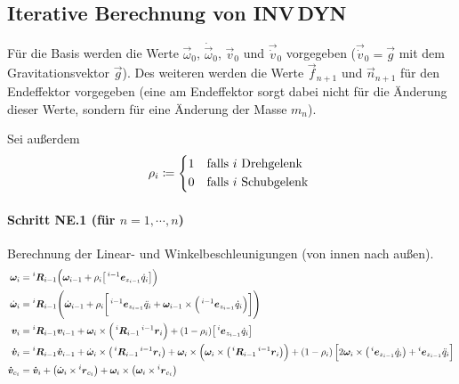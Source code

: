 		\subsection{Iterative Berechnung von INV\,DYN}
			Für die Basis werden die Werte \( \vec{\omega}_0 \), \( \dot{\vec{\omega}}_0 \), \( \vec{v}_0 \) und \( \vec{\dot{v}}_0 \) vorgegeben (\zB \( \vec{\dot{v}}_0 = \vec{g} \) mit dem Gravitationsvektor \(\vec{g}\)). Des weiteren werden die Werte \( \vec{f}_{n + 1} \) und \( \vec{n}_{n + 1} \) für den Endeffektor vorgegeben (eine am Endeffektor sorgt dabei nicht für die Änderung dieser Werte, sondern für eine Änderung der Masse \(m_n\)).

			Sei außerdem
			\begin{equation*}
				\rho_i \coloneqq
					\begin{cases*}
						1 & falls \(i\) Drehgelenk \\
						0 & falls \(i\) Schubgelenk
					\end{cases*}
			\end{equation*}

			\paragraph{Schritt NE.1 (für \( n = 1, \cdots, n \))}
				Berechnung der Linear- und Winkelbeschleunigungen (von innen nach außen).
				\begin{align*}
					\bm{\omega}_i &= \prescript{i}{}{\bm{R}}_{i - 1} \Big( \bm{\omega}_{i - 1} + \rho_i \big[ \prescript{i - 1}{}{\bm{e}}_{z_{i - 1}} \dot{q}_i \big] \Big) \\
					\dot{\bm{\omega}}_i &= \prescript{i}{}{\bm{R}}_{i - 1} \Bigg( \dot{\bm{\omega}}_{i - 1} + \rho_i \bigg[ \prescript{i - 1}{}{\bm{e}}_{z_{i - 1}} \ddot{q}_i + \bm{\omega}_{i - 1} \times \Big( \prescript{i - 1}{}{\bm{e}}_{z_{i - 1}} \dot{q}_i \Big) \bigg] \Bigg) \\
					\bm{v}_i &= \prescript{i}{}{\bm{R}}_{i - 1} \bm{v}_{i - 1} + \bm{\omega}_i \times \Big( \prescript{i}{}{\bm{R}}_{i - 1} \prescript{i - 1}{}{\bm{r}}_i \Big) + (1 - \rho_i) \big[ \prescript{i}{}{\bm{e}}_{z_{i - 1}} \dot{q}_i \big] \\
					\bm{\dot{v}}_i &= \prescript{i}{}{\bm{R}}_{i - 1} \bm{\dot{v}}_{i - 1} + \dot{\bm{\omega}}_i \times \big( \prescript{i}{}{\bm{R}}_{i - 1} \prescript{i - 1}{}{\bm{r}}_i \big) + \bm{\omega}_i \times \Big( \bm{\omega}_i \times \big( \prescript{i}{}{\bm{R}}_{i - 1} \prescript{i - 1}{}{\bm{r}}_i \big) \Big) + (1 - \rho_i) \, \Big[ 2\bm{\omega}_i \times \big( \prescript{i}{}{\bm{e}}_{z_{i - 1}} \dot{q}_i \big) + \prescript{i}{}{\bm{e}}_{z_{i - 1}} \ddot{q}_i \Big] \\
					\bm{\dot{v}}_{c_i} &= \bm{\dot{v}}_i + \big(\dot{\bm{\omega}}_i \times \prescript{i}{}{\bm{r}}_{c_i}\big) + \bm{\omega}_i \times \big( \bm{\omega}_i \times \prescript{i}{}{\bm{r}}_{c_i} \big)
				\end{align*}

